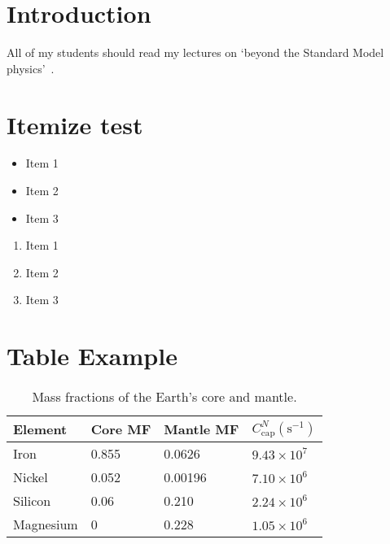 \documentclass[12pt]{article}
\numberwithin{equation}{section}    %
\begin{document}



\section{Introduction}

All of my students should read my lectures on `beyond the Standard Model physics'~\cite{Csaki:2016kln}.

 
\section{Itemize test}

\begin{itemize}%
\item Item 1
\item Item 2
\item Item 3
\end{itemize}

\begin{enumerate}%
\item Item 1
\item Item 2
\item Item 3
\end{enumerate}

\section{Table Example}

 
\begin{table}
	\renewcommand{\arraystretch}{1.3} %
	\centering
	\begin{tabular}{ @{} llll @{} } \toprule %
		Element & Core MF & Mantle MF & $C_\text{cap}^N (\text{s}^{-1})$ 
		\\ \hline
		Iron & 0.855 & 0.0626 & $9.43\times 10^{7}$ 
		\\
		Nickel & 0.052 & 0.00196 & $7.10\times 10^{6}$ 
		\\
		Silicon & 0.06 & 0.210 & $2.24\times 10^{6}$ 
		\\
		Magnesium & 0 & 0.228 & $1.05\times 10^{6}$ 
		\\ \bottomrule
	\end{tabular}
	\caption{
		Mass fractions of the Earth's core and mantle.
		\label{table:elements}
	}
\end{table}
\end{document}
